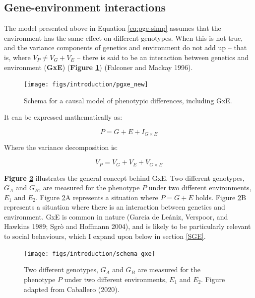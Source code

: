 \documentclass[
]{book}
\begin{document}
\hypertarget{gene-environment-interactions}{%
\subsection{Gene-environment interactions}\label{gene-environment-interactions}}

The model presented above in Equation \eqref{eq:pge-simp} assumes that the environment has the same effect on different genotypes. When this is not true, and the variance components of genetics and environment do not add up -- that is, where \(V_{P} \neq V_{G} + V_{E}\) -- there is said to be an interaction between genetics and environment (\textbf{GxE}) (\textbf{Figure \ref{fig:pgxe}}) (Falconer and Mackay 1996).



\begin{figure}

{\centering \texttt{[image: figs/introduction/pgxe\_new]} 

}

\caption{Schema for a causal model of phenotypic differences, including GxE.}\label{fig:pgxe}
\end{figure}

It can be expressed mathematically as:

\begin{equation}
P = G + E + I_{G\times E} \label{eq:gbye}
\end{equation}

Where the variance decomposition is:

\begin{equation}
V_P = V_G + V_E + V_{G\times E} \label{eq:gbyedecomp}
\end{equation}

\textbf{Figure \ref{fig:schema-gxe}} illustrates the general concept behind GxE. Two different genotypes, \(G_A\) and \(G_B\), are measured for the phenotype \(P\) under two different environments, \(E_1\) and \(E_2\). Figure \ref{fig:schema-gxe}A represents a situation where \(P = G + E\) holds. Figure \ref{fig:schema-gxe}B represents a situation where there is an interaction between genetics and environment. GxE is common in nature (Garcia de Leániz, Verspoor, and Hawkins 1989; Sgrò and Hoffmann 2004), and is likely to be particularly relevant to social behaviours, which I expand upon below in section \ref{SGE}.



\begin{figure}

{\centering \texttt{[image: figs/introduction/schema\_gxe]} 

}

\caption{Two different genotypes, \(G_A\) and \(G_B\) are measured for the phenotype \(P\) under two different environments, \(E_1\) and \(E_2\). Figure adapted from Caballero (2020).}\label{fig:schema-gxe}
\end{figure}
\end{document}
